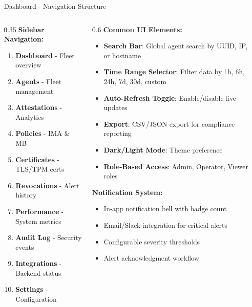 \begin{frame}{Dashboard - Navigation Structure}
  \begin{columns}[T]
    \begin{column}{0.35\textwidth}
      \textbf{Sidebar Navigation:}
      \scriptsize
      \begin{enumerate}
        \item \textbf{Dashboard} - Fleet overview
        \item \textbf{Agents} - Fleet management
        \item \textbf{Attestations} - Analytics
        \item \textbf{Policies} - IMA \& MB
        \item \textbf{Certificates} - TLS/TPM certs
        \item \textbf{Revocations} - Alert history
        \item \textbf{Performance} - System metrics
        \item \textbf{Audit Log} - Security events
        \item \textbf{Integrations} - Backend status
        \item \textbf{Settings} - Configuration
      \end{enumerate}
    \end{column}
    \begin{column}{0.6\textwidth}
      \textbf{Common UI Elements:}
      \scriptsize
      \begin{itemize}
        \item \textbf{Search Bar}: Global agent search by UUID, IP, or hostname
        \item \textbf{Time Range Selector}: Filter data by 1h, 6h, 24h, 7d, 30d, custom
        \item \textbf{Auto-Refresh Toggle}: Enable/disable live updates
        \item \textbf{Export}: CSV/JSON export for compliance reporting
        \item \textbf{Dark/Light Mode}: Theme preference
        \item \textbf{Role-Based Access}: Admin, Operator, Viewer roles
      \end{itemize}

      \vspace{0.2cm}

      \textbf{Notification System:}
      \begin{itemize}
        \item In-app notification bell with badge count
        \item Email/Slack integration for critical alerts
        \item Configurable severity thresholds
        \item Alert acknowledgment workflow
      \end{itemize}
    \end{column}
  \end{columns}
\end{frame}
